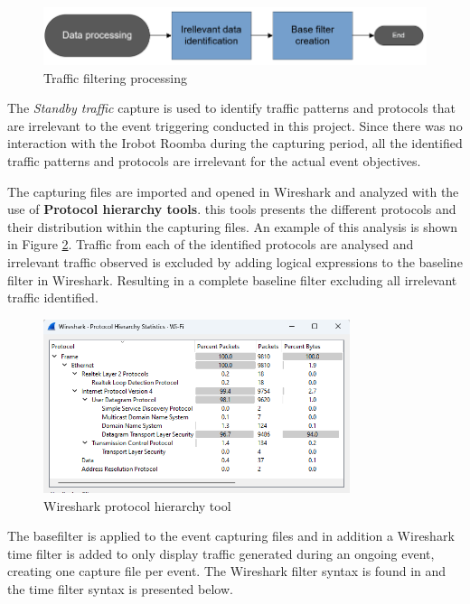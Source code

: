\begin{figure}[H]
    \centering
    \includegraphics[width=\textwidth]{figures/TrafficProcessingProcess.png}
    \caption{Traffic filtering processing}
    \label{fig:TrafficProcessingProcess}
\end{figure}

The \textit{Standby traffic} capture is used to identify traffic patterns and protocols that are irrelevant to the event triggering conducted in this project. Since there was no interaction with the Irobot Roomba during the capturing period, all the identified traffic patterns and protocols are irrelevant for the actual event objectives. 

The capturing files are imported and opened in Wireshark and analyzed with the use of \textbf{Protocol hierarchy tools}. this tools presents the different protocols and their distribution within the capturing files. An example of this analysis is shown in Figure \ref{fig:wiresharkprotocolstatistictools}. Traffic from each of the identified protocols are analysed and irrelevant traffic observed is excluded by adding logical expressions to the baseline filter in Wireshark. Resulting in a complete baseline filter excluding all irrelevant traffic identified. 

\begin{figure}[H]
    \centering
    \includegraphics[width=0.8\textwidth]{figures/wireshark_protocol_hirarcy.png}
    \caption{Wireshark protocol hierarchy tool}
    \label{fig:wiresharkprotocolstatistictools}
\end{figure}

The basefilter is applied to the event capturing files and in addition a Wireshark time filter is added to only display traffic generated during an ongoing event, creating one capture file per event. The Wireshark filter syntax is found in \cite{wireshark} and the time filter syntax is presented below. 

